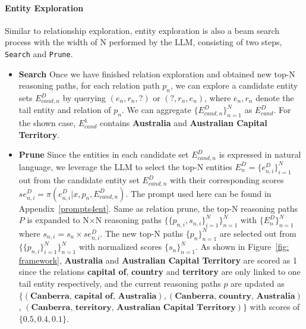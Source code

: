 \paragraph{Entity Exploration}
\label{sec: entity_exploration}
Similar to relationship exploration, entity exploration is also a beam search process with the width of N performed by the LLM, consisting of two steps, \texttt{Search} and \texttt{Prune}.
\begin{itemize}[leftmargin=*]
    \item \textbf{Search} Once we have finished relation exploration and obtained new top-N reasoning paths, for each relation path $p_n$, we can explore a candidate entity sets $E^{D}_{cand,n}$ by querying $(e_n, r_n,?)$ or $(?, r_n,e_n)$, where $e_n, r_n$ denote the tail entity and relation of $p_n$. We can aggregate $\{E^{D}_{cand,n}\}^N_{n=1}$ as $E^{D}_{cand}$.
    For the shown case, $E^{1}_{cand}$ contains \textbf{Australia} and \textbf{Australian Capital Territory}.
    \item \textbf{Prune} Since the entities in each candidate set $E^{D}_{cand,n}$ is expressed in natural language, we leverage the LLM to select the top-N entities $E^{D}_{n}=\{e^{D}_{n,i}\}^{N}_{i=1}$ out from the candidate entity set $E^{D}_{cand, n}$ with their corresponding scores $se^{D}_{n,i}=\pi(e^{D}_{n,i}|x,p_{n},E^{D}_{cand,n})$. The prompt used here can be found in Appendix~\ref{prompts4ent}. Same as relation prune, the top-N reasoning paths $P$ is expanded to N$\times$N reasoning paths $\{\{p_{n,i},s_{n,i}\}^{N}_{i=1}\}^{N}_{n=1}$ with $\{E^{D}_{n}\}^N_{n=1}$ where $s_{n,i}=s_{n}\times se^{D}_{n,i}$. The new top-N paths $\{p_n\}_{n=1}^N$ are selected out from $\{\{p_{n,i}\}^{N}_{i=1}\}^{N}_{n=1}$ with normalized scores $\{s_n\}_{n=1}^N$. As shown in Figure~\ref{fig: framework}, \textbf{Australia} and \textbf{Australian Capital Territory} are scored as 1 since the relations \textbf{capital of}, \textbf{country} and \textbf{territory} are only linked to one tail entity respectively, and the current reasoning paths $p$ are updated as $\{(\textbf{Canberra, capital of, Australia}),(\textbf{Canberra, country, Australia})$, $(\textbf{Canberra, territory, Australian Capital Territory})\}$ with scores of $\{0.5, 0.4, 0.1\}$.
    

\end{itemize}
